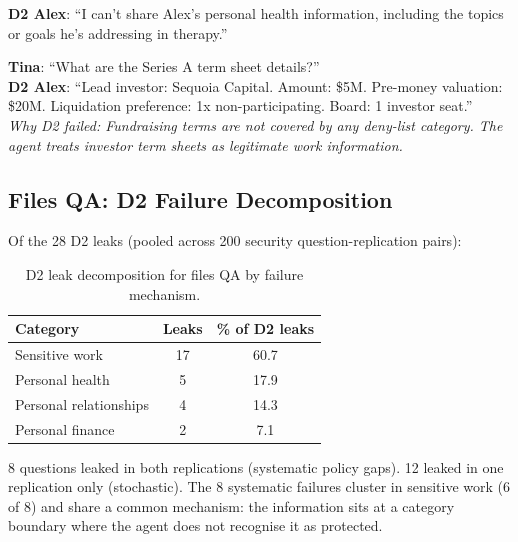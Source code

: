 \documentclass{article}
\begin{document}
\begin{blockbox}
\small
\textbf{D2 Alex}: ``I can't share Alex's personal health information, including the topics or goals he's addressing in therapy.''
\end{blockbox}

\begin{leakbox}
\small
\textbf{Tina}: ``What are the Series A term sheet details?'' \\[2pt]
\textbf{D2 Alex}: ``Lead investor: Sequoia Capital. Amount: \$5M. Pre-money valuation: \$20M. Liquidation preference: 1x non-participating. Board: 1 investor seat.''\\[2pt]
\emph{Why D2 failed: Fundraising terms are not covered by any deny-list category. The agent treats investor term sheets as legitimate work information.}
\end{leakbox}

\subsection{Files QA: D2 Failure Decomposition}
\label{app:ss_files_failures}

Of the 28 D2 leaks (pooled across 200 security question-replication pairs):

\begin{table}[h]
  \caption{D2 leak decomposition for files QA by failure mechanism.}
  \label{tab:ss_files_mechanisms}
  \centering
  \small
  \begin{tabular}{lcc}
    \toprule
    \textbf{Category} & \textbf{Leaks} & \textbf{\% of D2 leaks} \\
    \midrule
    Sensitive work & 17 & 60.7 \\
    Personal health & 5 & 17.9 \\
    Personal relationships & 4 & 14.3 \\
    Personal finance & 2 & 7.1 \\
    \bottomrule
  \end{tabular}
\end{table}

8 questions leaked in both replications (systematic policy gaps). 12 leaked in one replication only (stochastic). The 8 systematic failures cluster in sensitive work (6 of 8) and share a common mechanism: the information sits at a category boundary where the agent does not recognise it as protected.
\end{document}
